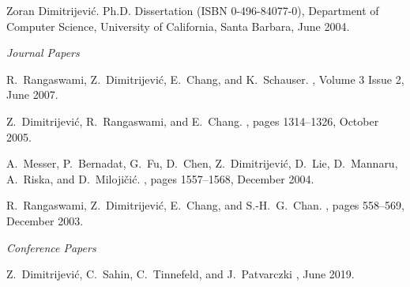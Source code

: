 \documentclass[10pt]{article}
\renewcommand{\subsection}[1]{ \vspace{2pt}\begin{flushleft}{\hspace{-0.1in} \large\it
    #1}\end{flushleft}\nopagebreak }
\begin{document}
\begin{thebibliography}{22.}

\vspace{-6pt}

 Zoran Dimitrijevi\'c. 
 \newblock Ph.D. Dissertation (ISBN 0-496-84077-0), Department of Computer Science, 
 University of California, Santa Barbara, June 2004.


\subsection{Journal Papers}
\vspace{-6pt}

 R.~Rangaswami, Z.~Dimitrijevi\'c, E.~Chang, and K.~Schauser.
 , Volume 3 Issue 2, June 2007.

 Z.~Dimitrijevi\'c, R.~Rangaswami, and E.~Chang.
 , pages 1314--1326, October 2005.

 A.~Messer, P.~Bernadat, G.~Fu, D.~Chen, Z.~Dimitrijevi\'c, 
 D.~Lie, D.~Mannaru, A.~Riska, and D.~Miloji\v{c}i\'c.
 , pages 1557--1568, December 2004.


 R.~Rangaswami, Z.~Dimitrijevi\'c, E.~Chang, and S.-H.~G.~Chan.
 , pages 558--569, December 2003.

\subsection{Conference Papers}
\vspace{-6pt}

 Z.~Dimitrijevi\'c, C.~Sahin, C.~Tinnefeld, and J.~Patvarczki
 , June 2019.


\end{thebibliography}
\end{document}
